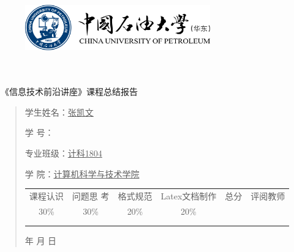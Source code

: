 \documentclass{article}
\renewcommand{\today}{\number\year 年 \number\month 月 \number\day 日}
\begin{document}
\begin{figure}
    \centering
    \includegraphics[width=8cm]{upc.png}

    \label{figupc}
\end{figure}

	\begin{center}
		\quad \\
		\quad \\
		\heiti \fontsize{45}{17} \quad \quad \quad 
		\vskip 1.5cm
		\heiti {} 《信息技术前沿讲座》课程总结报告
	\end{center}
	\vskip 2.0cm
		
	\begin{quotation}
		\doublespacing
		
        \par\setlength\parindent{7em}
		\quad 

		学生姓名：\underline{\qquad  张凯文 \qquad \qquad}

		学\hspace{0.61cm} 号：\underline{\qquad}
		
		专业班级：\underline{\qquad 计科1804 \qquad  }
		
        学\hspace{0.61cm} 院：\underline{计算机科学与技术学院}
		\vskip 2cm
		\centering
		\begin{table}[h]
            \centering 
            \begin{tabular}{|c|c|c|c|c|c|}
                \hline
                课程认识 & 问题思 考 & 格式规范  & Latex文档制作   & 总分 & 评阅教师 \\
                30\% & 30\% & 20\% & 20\%  &  &  \\
                \hline
                 & & & &  &\\
                & & & &  &\\
                \hline
            \end{tabular}
        \end{table}
		\vskip 2cm
		\today
	\end{quotation}
\end{document}

